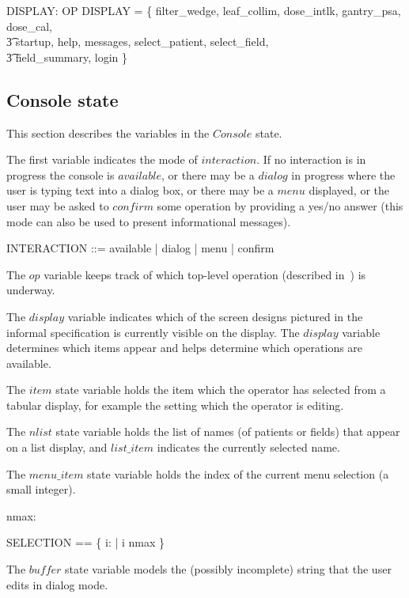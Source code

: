 \begin{axdef}
	DISPLAY: \power OP
\where
DISPLAY = \{ filter\_wedge, leaf\_collim, dose\_intlk, gantry\_psa, dose\_cal, \\
\t3	startup, help, messages, select\_patient, select\_field, \\
\t3	field\_summary, login \}
\end{axdef}

\subsection{Console state}

This section describes the variables in the $Console$ state.  

The first variable indicates the mode of $interaction$.  If no
interaction is in progress the console is $available$, or there
may be a $dialog$ in progress where the user is typing text into a
dialog box, or there may be a $menu$ displayed, or the user may be
asked to $confirm$ some operation by providing a yes/no answer (this
mode can also be used to present informational messages).

\begin{zed}
	INTERACTION ::= available | dialog | menu | confirm
\end{zed}
The $op$ variable keeps track of which top-level operation
(described in~\cite{jacky92}) is underway.

The $display$ variable indicates which of the screen designs pictured
in the informal specification is currently visible on the display.
The $display$ variable determines which items appear and helps
determine which operations are available.  

The $item$ state variable holds the item which the operator has
selected from a tabular display, for example the setting which
the operator is editing.

The $nlist$ state variable holds the list of names (of patients or
fields) that appear on a list display, and $list\_item$ indicates 
the currently selected name.

The $menu\_item$ state variable holds the index of the current menu
selection (a small integer).

\begin{axdef}
	nmax: \nat
\end{axdef}
\begin{zed} SELECTION == \{ i: \nat | i \leq nmax \} \end{zed}
The $buffer$ state variable models the (possibly incomplete) string
that the user edits in dialog mode.

